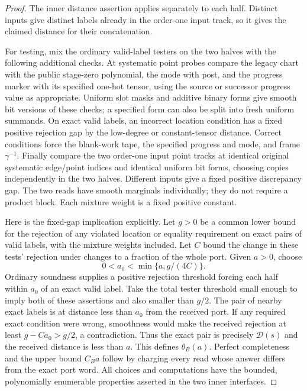 \begin{proof}
The inner distance assertion applies separately to each half. Distinct
inputs give distinct labels already in the order-one input track, so it
gives the claimed distance for their concatenation.

For testing, mix the ordinary valid-label testers on the two halves with
the following additional checks. At systematic point probes compare the
legacy chart with the public stage-zero polynomial, the mode with post,
and the progress marker with its specified one-hot tensor, using the
source or successor progress value as appropriate. Uniform slot masks
and additive binary forms give smooth bit versions of these checks; a
specified form can also be split into fresh uniform summands. On exact
valid labels, an incorrect location condition has a fixed positive
rejection gap by the low-degree or constant-tensor distance. Correct
conditions force the blank-work tape, the specified progress and mode,
and frame $\gamma^{-1}$. Finally compare the two order-one input point
tracks at identical original systematic edge/point indices and identical
uniform bit forms, choosing copies independently in the two halves.
Different inputs give a fixed positive discrepancy gap. The two reads
have smooth marginals individually; they do not require a product block.
Each mixture weight is a fixed positive constant.

Here is the fixed-gap implication explicitly. Let $g>0$ be a common lower
bound for the rejection of any violated location or equality requirement
on exact pairs of valid labels, with the mixture weights included. Let
$C$ bound the change in these tests' rejection under changes to a fraction
of the whole port. Given $a>0$, choose
\[
 0<a_0<\min\{a,g/(4C)\}.
\]
Ordinary soundness supplies a positive rejection threshold forcing each
half within $a_0$ of an exact valid label. Take the total tester threshold
small enough to imply both of these assertions and also smaller than
$g/2$. The pair of nearby exact labels is at distance less than $a_0$
from the received port. If any required exact condition were wrong,
smoothness would make the received rejection at least
$g-Ca_0>g/2$, a contradiction. Thus the exact pair is precisely
$\mathcal D(s)$ and the received distance is less than $a$. This defines
$\theta_B(a)$. Perfect completeness and the upper bound $C_Ba$ follow by
charging every read whose answer differs from the exact port word. All
choices and computations have the bounded, polynomially enumerable
properties asserted in the two inner interfaces.


\end{proof}
